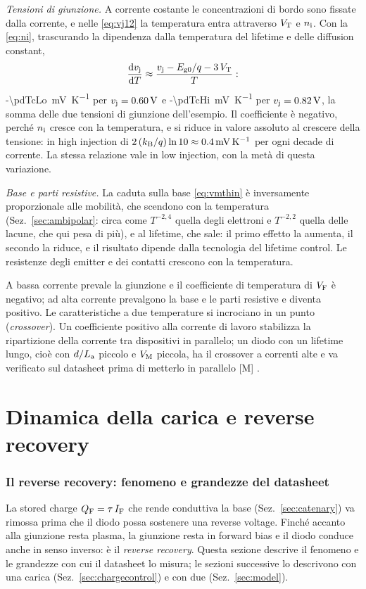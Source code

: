 \documentclass[10pt,a4paper]{scrartcl}
\let\newcommand\pdvaluedefine
\newcommand{\IF}{I_\mathrm{F}}
\newcommand{\VF}{V_\mathrm{F}}
\newcommand{\vj}{v_\mathrm{j}}
\newcommand{\VT}{V_\mathrm{T}}
\newcommand{\diff}{\mathrm{d}}
\newcommand{\nint}{n_\mathrm{i}}
\newcommand{\La}{L_\mathrm{a}}
\newcommand{\VM}{V_\mathrm{M}}
\newcommand{\QF}{Q_\mathrm{F}}
\newcommand{\kB}{k_\mathrm{B}}
\newcommand{\Pp}{p\textsuperscript{+}}
\newcommand{\Nm}{n\textsuperscript{--}}
\begin{document}
\emph{Tensioni di giunzione.} A corrente costante le concentrazioni di bordo sono fissate dalla corrente, e nelle \eqref{eq:vj12} la temperatura entra attraverso $\VT$ e $\nint$. Con la \eqref{eq:ni}, trascurando la dipendenza dalla temperatura del lifetime e delle diffusion constant,
\begin{equation}
\frac{\diff\vj}{\diff T} \approx \frac{\vj - E_\mathrm{g0}/q - 3\,\VT}{T} :
\label{eq:tc}
\end{equation}
\SI{-\pdTcLo}{\milli\volt\per\kelvin} per $\vj = \SI{\pdTcVjLo}{\volt}$ e \SI{-\pdTcHi}{\milli\volt\per\kelvin} per $\vj = \SI{\pdTcVjHi}{\volt}$, la somma delle due tensioni di giunzione dell'esempio. Il coefficiente è negativo, perché $\nint$ cresce con la temperatura, e si riduce in valore assoluto al crescere della tensione: in high injection di $2\,(\kB/q)\ln 10 \approx \SI{0.4}{\milli\volt\per\kelvin}$ per ogni decade di corrente. La stessa relazione vale in low injection, con la metà di questa variazione.

\emph{Base e parti resistive.} La caduta sulla base \eqref{eq:vmthin} è inversamente proporzionale alle mobilità, che scendono con la temperatura (Sez.~\ref{sec:ambipolar}: circa come $T^{-2,4}$ quella degli elettroni e $T^{-2,2}$ quella delle lacune, che qui pesa di più), e al lifetime, che sale: il primo effetto la aumenta, il secondo la riduce, e il risultato dipende dalla tecnologia del lifetime control. Le resistenze degli emitter e dei contatti crescono con la temperatura.

A bassa corrente prevale la giunzione e il coefficiente di temperatura di $\VF$ è negativo; ad alta corrente prevalgono la base e le parti resistive e diventa positivo. Le caratteristiche a due temperature si incrociano in un punto (\emph{crossover}). Un coefficiente positivo alla corrente di lavoro stabilizza la ripartizione della corrente tra dispositivi in parallelo; un diodo con un lifetime lungo, cioè con $d/\La$ piccolo e $\VM$ piccola, ha il crossover a correnti alte e va verificato sul datasheet prima di metterlo in parallelo [M] \cite{lutz}.
\part{Dinamica della carica e reverse recovery}

\section{Il reverse recovery: fenomeno e grandezze del datasheet}
\label{sec:datasheet}
La stored charge $\QF = \tau\,\IF$ che rende conduttiva la base (Sez.~\ref{sec:catenary}) va rimossa prima che il diodo possa sostenere una reverse voltage. Finché accanto alla giunzione \Pp\Nm{} resta plasma, la giunzione resta in forward bias e il diodo conduce anche in senso inverso: è il \emph{reverse recovery}. Questa sezione descrive il fenomeno e le grandezze con cui il datasheet lo misura; le sezioni successive lo descrivono con una carica (Sez.~\ref{sec:chargecontrol}) e con due (Sez.~\ref{sec:model}).
\end{document}
